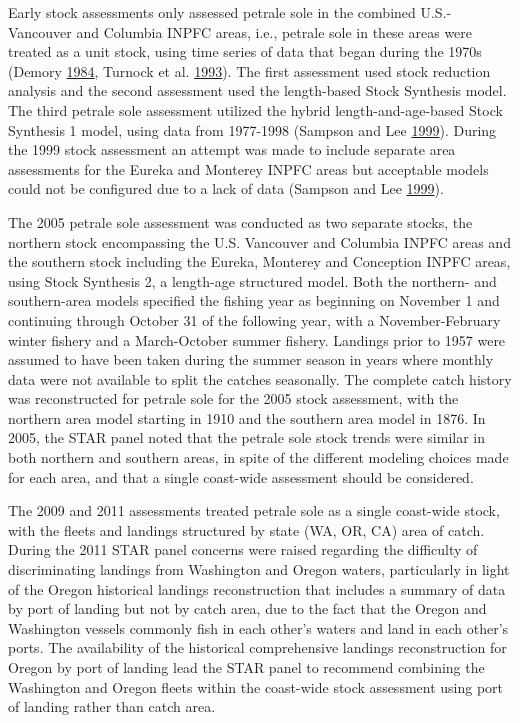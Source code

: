 \documentclass[12pt,]{article}
\begin{document}
Early stock assessments only assessed petrale sole in the combined
U.S.-Vancouver and Columbia INPFC areas, i.e., petrale sole in these
areas were treated as a unit stock, using time series of data that began
during the 1970s (Demory
\protect\hyperlink{ref-demory_progress_1984}{1984}, Turnock et al.
\protect\hyperlink{ref-turnock_status_1993}{1993}). The first assessment
used stock reduction analysis and the second assessment used the
length-based Stock Synthesis model. The third petrale sole assessment
utilized the hybrid length-and-age-based Stock Synthesis 1 model, using
data from 1977-1998 (Sampson and Lee
\protect\hyperlink{ref-sampson_assessment_1999}{1999}). During the 1999
stock assessment an attempt was made to include separate area
assessments for the Eureka and Monterey INPFC areas but acceptable
models could not be configured due to a lack of data (Sampson and Lee
\protect\hyperlink{ref-sampson_assessment_1999}{1999}).

The 2005 petrale sole assessment was conducted as two separate stocks,
the northern stock encompassing the U.S. Vancouver and Columbia INPFC
areas and the southern stock including the Eureka, Monterey and
Conception INPFC areas, using Stock Synthesis 2, a length-age structured
model. Both the northern- and southern-area models specified the fishing
year as beginning on November 1 and continuing through October 31 of the
following year, with a November-February winter fishery and a
March-October summer fishery. Landings prior to 1957 were assumed to
have been taken during the summer season in years where monthly data
were not available to split the catches seasonally. The complete catch
history was reconstructed for petrale sole for the 2005 stock
assessment, with the northern area model starting in 1910 and the
southern area model in 1876. In 2005, the STAR panel noted that the
petrale sole stock trends were similar in both northern and southern
areas, in spite of the different modeling choices made for each area,
and that a single coast-wide assessment should be considered.

The 2009 and 2011 assessments treated petrale sole as a single
coast-wide stock, with the fleets and landings structured by state (WA,
OR, CA) area of catch. During the 2011 STAR panel concerns were raised
regarding the difficulty of discriminating landings from Washington and
Oregon waters, particularly in light of the Oregon historical landings
reconstruction that includes a summary of data by port of landing but
not by catch area, due to the fact that the Oregon and Washington
vessels commonly fish in each other's waters and land in each other's
ports. The availability of the historical comprehensive landings
reconstruction for Oregon by port of landing lead the STAR panel to
recommend combining the Washington and Oregon fleets within the
coast-wide stock assessment using port of landing rather than catch
area.
\end{document}
